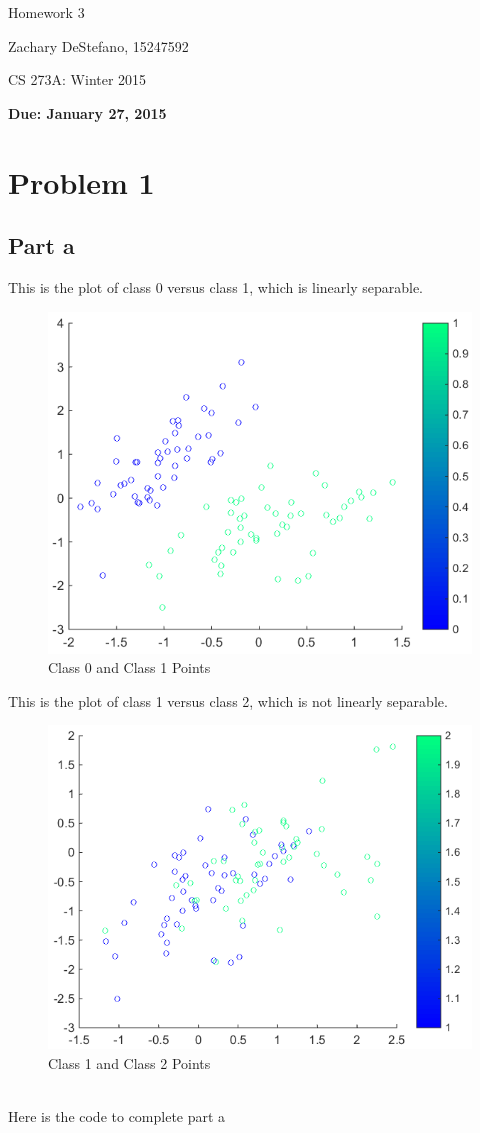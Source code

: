 \documentclass[twoside,11pt]{article}
\theoremstyle{definition}
\begin{document}
\centerline{\Large Homework 3}
\centerline{Zachary DeStefano, 15247592}
\centerline{CS 273A: Winter 2015}
\centerline{\bf Due: January 27, 2015}

\section*{Problem 1}

\subsection*{Part a}

This is the plot of class 0 versus class 1, which is linearly separable. \\
\begin{figure}[h]
\centering
\includegraphics[width=4 in]{prob1aPlot1.png}
\caption{Class 0 and Class 1 Points}
\end{figure}
\newpage
This is the plot of class 1 versus class 2, which is not linearly separable. \\
\begin{figure}[h]
\centering
\includegraphics[width=4 in]{prob1aPlot2.png}
\caption{Class 1 and Class 2 Points}
\end{figure}
\\
Here is the code to complete part a

\newpage
\end{document}
